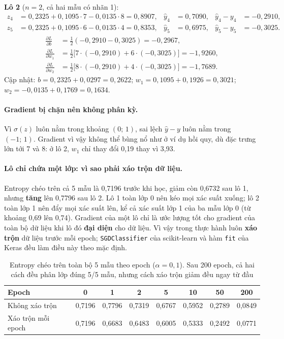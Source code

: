 \noindent\textbf{Lô 2} ($n = 2$, cả hai mẫu có nhãn 1):
\begin{align*}
    z_4 &= 0{,}2325 + 0{,}1095 \cdot 7 - 0{,}0135 \cdot 8 = 0{,}8907, & \hat{y}_4 &= 0{,}7090, & \hat{y}_4 - y_4 &= -0{,}2910,\\
    z_5 &= 0{,}2325 + 0{,}1095 \cdot 6 - 0{,}0135 \cdot 4 = 0{,}8353, & \hat{y}_5 &= 0{,}6975, & \hat{y}_5 - y_5 &= -0{,}3025.
\end{align*}
\begin{align*}
    \frac{\partial L}{\partial b} &= \tfrac{1}{2}(-0{,}2910 - 0{,}3025) = -0{,}2967,\\
    \frac{\partial L}{\partial w_1} &= \tfrac{1}{2}\big[7 \cdot (-0{,}2910) + 6 \cdot (-0{,}3025)\big] = -1{,}9260,\\
    \frac{\partial L}{\partial w_2} &= \tfrac{1}{2}\big[8 \cdot (-0{,}2910) + 4 \cdot (-0{,}3025)\big] = -1{,}7689.
\end{align*}
Cập nhật: $b = 0{,}2325 + 0{,}0297 = 0{,}2622$; $w_1 = 0{,}1095 + 0{,}1926 = 0{,}3021$; $w_2 = -0{,}0135 + 0{,}1769 = 0{,}1634$.

\paragraph{Gradient bị chặn nên không phân kỳ.} Vì $\sigma(z)$ luôn nằm trong khoảng $(0;\,1)$, sai lệch $\hat{y} - y$ luôn nằm trong $(-1;\,1)$. Gradient vì vậy không thể bùng nổ như ở ví dụ hồi quy, dù đặc trưng lớn tới 7 và 8: ở lô 2, $w_1$ chỉ thay đổi 0,19 thay vì 3,93.

\paragraph{Lô chỉ chứa một lớp: vì sao phải xáo trộn dữ liệu.} Entropy chéo trên cả 5 mẫu là 0,7196 trước khi học, giảm còn 0,6732 sau lô 1, nhưng \textbf{tăng} lên 0,7796 sau lô 2. Lô 1 toàn lớp 0 nên kéo mọi xác suất xuống; lô 2 toàn lớp 1 nên đẩy mọi xác suất lên, kể cả xác suất lớp 1 của ba mẫu lớp 0 (từ khoảng 0,69 lên 0,74). Gradient của một lô chỉ là ước lượng tốt cho gradient của toàn bộ dữ liệu khi lô đó \textbf{đại diện} cho dữ liệu. Vì vậy trong thực hành luôn \textbf{xáo trộn} dữ liệu trước mỗi epoch; \texttt{SGDClassifier} của scikit-learn và hàm \texttt{fit} của Keras đều làm điều này theo mặc định.

\begin{table}[H]
\centering
\begin{tabular}{|l|c|c|c|c|c|c|c|}
\hline
\textbf{Epoch} & 0 & 1 & 2 & 5 & 10 & 50 & 200 \\
\hline
Không xáo trộn & 0,7196 & 0,7796 & 0,7319 & 0,6767 & 0,5952 & 0,2789 & 0,0849 \\ \hline
Xáo trộn mỗi epoch & 0,7196 & 0,6683 & 0,6483 & 0,6005 & 0,5333 & 0,2492 & 0,0771 \\ \hline
\end{tabular}
\caption{Entropy chéo trên toàn bộ 5 mẫu theo epoch ($\alpha = 0{,}1$). Sau 200 epoch, cả hai cách đều phân lớp đúng 5/5 mẫu, nhưng cách xáo trộn giảm đều ngay từ đầu}
\label{tab:minibatch-shuffle}
\end{table}

